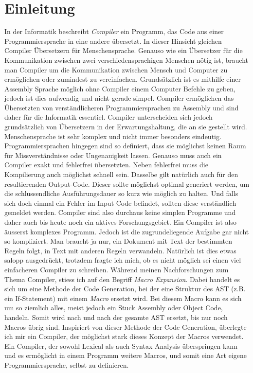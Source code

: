 \chapter{Einleitung}
In der Informatik beschreibt \textit{Compiler} ein Programm, das Code aus einer Programmiersprache in eine andere übersetzt. In dieser Hinsicht gleichen Compiler Übersetzern für Menschensprache.
Genauso wie ein Übersetzer für die Kommunikation zwischen zwei verschiedensprachigen Menschen nötig ist, braucht man Compiler um die Kommunikation zwischen Mensch und Computer zu ermöglichen oder zumindest zu vereinfachen.
Grundsätzlich ist es mithilfe einer Assembly Sprache möglich ohne Compiler einem Computer Befehle zu geben, jedoch ist dies aufwendig und nicht gerade simpel. 
Compiler ermöglichen das Übersetzten von verständlicheren Programmiersprachen zu Assembly und sind daher für die Informatik essentiel.
Compiler unterscheiden sich jedoch grundsätzlich von Übersetzern in der Erwartungshaltung, die an sie gestellt wird. Menschensprache ist sehr komplex und nicht immer besonders eindeutig. 
Programmiersprachen hingegen sind so definiert, dass sie möglichst keinen Raum für Missverständnisse oder Ungenauigkeit lassen. Genauso muss auch ein Compiler exakt und fehlerfrei übersetzten.
Neben fehlerfrei muss die Kompilierung auch möglichst schnell sein. Dasselbe gilt natürlich auch für den resultierenden Output-Code. Dieser sollte möglichst optimal generiert werden, um die schlussendliche
Ausführungsdauer so kurz wie möglich zu halten. Und falls sich doch einmal ein Fehler im Input-Code befindet, sollten diese verständlich gemeldet werden. Compiler sind also durchaus keine simplen Programme und daher auch bis heute noch
ein aktives Forschungsgebiet.  
Ein Compiler ist also äusserst komplexes Programm. Jedoch ist die zugrundeliegende Aufgabe gar nicht so kompliziert.
Man braucht ja nur, ein Dokument mit Text der bestimmten Regeln folgt, in Text mit anderen Regeln verwandeln. Natürlich ist dies etwas salopp ausgedrückt, trotzdem fragte ich mich,
ob es nicht möglich sei einen viel einfacheren Compiler zu schreiben. Während meinen Nachforschungen zum Thema Compiler, stiess ich auf den Begriff \textit{Macro Expansion}.
Dabei handelt es sich um eine Methode der Code Generation, bei der eine Struktur des AST (z.B. ein If-Statement) mit einem \textit{Macro} ersetzt wird. Bei diesem Macro kann es sich um so ziemlich alles,
meist jedoch ein Stuck Assembly oder Object Code, handeln. Somit wird nach und nach der gesamte AST ersetzt, bis nur noch Macros übrig sind. Inspiriert von dieser Methode der Code Generation,
überlegte ich mir ein Compiler, der möglichst stark dieses Konzept der Macros verwendet. Ein Compiler, der sowohl Lexical als auch Syntax Analysis überspringen kann und es ermöglicht in einem Programm weitere Macros,
und somit eine Art eigene Programmiersprache, selbst zu definieren.
